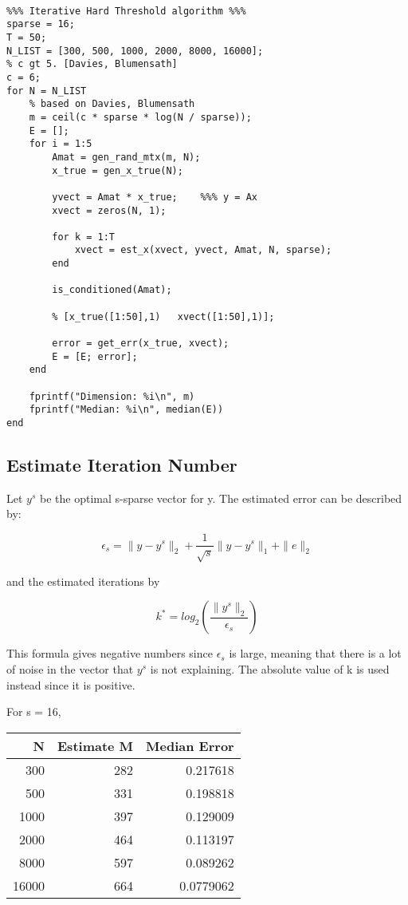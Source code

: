 \documentclass[11pt]{article}
\begin{document}
\begin{verbatim}

%%% Iterative Hard Threshold algorithm %%%
sparse = 16;
T = 50;
N_LIST = [300, 500, 1000, 2000, 8000, 16000];
% c gt 5. [Davies, Blumensath]
c = 6;
for N = N_LIST
    % based on Davies, Blumensath
    m = ceil(c * sparse * log(N / sparse));
    E = [];
    for i = 1:5
        Amat = gen_rand_mtx(m, N);
        x_true = gen_x_true(N);

        yvect = Amat * x_true;    %%% y = Ax
        xvect = zeros(N, 1);

        for k = 1:T
            xvect = est_x(xvect, yvect, Amat, N, sparse);
        end

        is_conditioned(Amat);

        % [x_true([1:50],1)   xvect([1:50],1)];

        error = get_err(x_true, xvect);
        E = [E; error];
    end

    fprintf("Dimension: %i\n", m)
    fprintf("Median: %i\n", median(E))
end
\end{verbatim}

\subsection{Estimate Iteration Number}
\label{sec:org4aac82e}

Let \(y^s\) be the optimal s-sparse vector for y. The estimated error can be
described by:

$$
\epsilon_s = \|y - y^s\|_2 + \frac{1}{\sqrt{s}} \|y - y^s\|_1 + \|e\|_2
$$

and the estimated iterations by

$$
k^* = log_2(\frac{\|y^s\|_2}{\epsilon_s})
$$

This formula gives negative numbers since \(\epsilon_s\) is large, meaning that
there is a lot of noise in the vector that \(y^s\) is not explaining. The absolute
value of k is used instead since it is positive.

For s = 16,

\begin{center}
\begin{tabular}{rrr}
N & Estimate M & Median Error\\
\hline
300 & 282 & 0.217618\\
500 & 331 & 0.198818\\
1000 & 397 & 0.129009\\
2000 & 464 & 0.113197\\
8000 & 597 & 0.089262\\
16000 & 664 & 0.0779062\\
\end{tabular}
\end{center}
\end{document}

